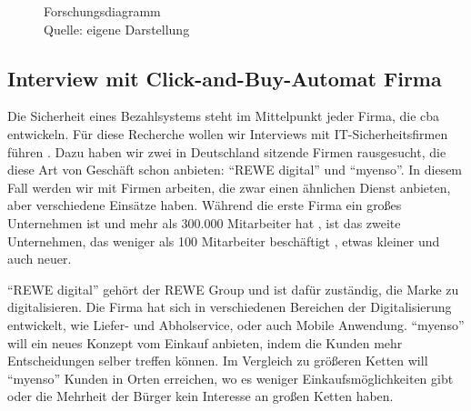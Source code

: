 \begin{figure}[H]
  \caption{Forschungsdiagramm
  \\ Quelle: eigene Darstellung}
  \label{fig:FD}
\end{figure}

\subsection{Interview mit Click-and-Buy-Automat Firma}

Die Sicherheit eines Bezahlsystems steht im Mittelpunkt jeder Firma, die \acrfull{cba} entwickeln. Für diese Recherche 
wollen wir Interviews mit IT-Sicherheitsfirmen führen \cite{refbook:FWDL}. Dazu haben wir zwei in Deutschland sitzende
Firmen rausgesucht, die diese Art von Geschäft schon anbieten: ``REWE digital'' und ``myenso''. In diesem Fall werden wir
mit Firmen arbeiten, die zwar einen ähnlichen Dienst anbieten, aber verschiedene Einsätze haben. Während die erste Firma  
ein großes Unternehmen ist und mehr als 300.000 Mitarbeiter hat \cite{refst:REWE}, ist das zweite Unternehmen, das weniger
als 100 Mitarbeiter beschäftigt \cite{refst:MYENSO}, etwas kleiner und auch neuer.

``REWE digital'' gehört der REWE Group und ist dafür zuständig, die Marke zu digitalisieren. Die Firma hat sich in verschiedenen 
Bereichen der Digitalisierung entwickelt, wie Liefer- und Abholservice, oder auch Mobile Anwendung. ``myenso'' will ein 
neues Konzept vom Einkauf anbieten, indem die Kunden mehr Entscheidungen selber treffen können. Im Vergleich zu größeren
Ketten will ``myenso'' Kunden in Orten erreichen, wo es weniger Einkaufsmöglichkeiten gibt oder die Mehrheit der Bürger
kein Interesse an großen Ketten haben.



